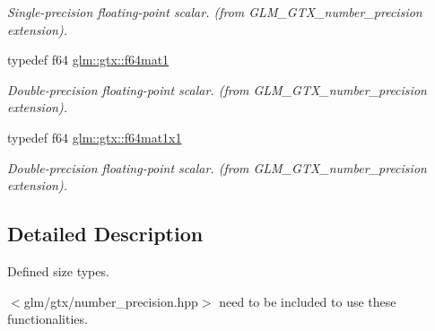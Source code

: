 \begin{CompactItemize}
\begin{CompactList}\small\item\em Single-precision floating-point scalar. (from GLM\_\-GTX\_\-number\_\-precision extension). \item\end{CompactList}\item 
\hypertarget{group__gtx__number__precision_g23f8f53c78b50aa07a113c3d07d01bc9}{
typedef f64 \hyperlink{group__gtx__number__precision_g23f8f53c78b50aa07a113c3d07d01bc9}{glm::gtx::f64mat1}}
\label{group__gtx__number__precision_g23f8f53c78b50aa07a113c3d07d01bc9}

\begin{CompactList}\small\item\em Double-precision floating-point scalar. (from GLM\_\-GTX\_\-number\_\-precision extension). \item\end{CompactList}\item 
\hypertarget{group__gtx__number__precision_g710a5952d78b22635c71c5fc2c0a3319}{
typedef f64 \hyperlink{group__gtx__number__precision_g710a5952d78b22635c71c5fc2c0a3319}{glm::gtx::f64mat1x1}}
\label{group__gtx__number__precision_g710a5952d78b22635c71c5fc2c0a3319}

\begin{CompactList}\small\item\em Double-precision floating-point scalar. (from GLM\_\-GTX\_\-number\_\-precision extension). \item\end{CompactList}\end{CompactItemize}


\subsection{Detailed Description}
Defined size types. 

$<$glm/gtx/number\_\-precision.hpp$>$ need to be included to use these functionalities. 
